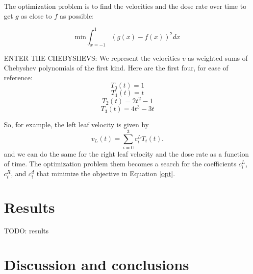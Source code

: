 \documentclass[12pt]{article}
\begin{document}
The optimization problem is to find the velocities and the dose rate over time to get $g$ as close to $f$ as possible:

\begin{equation}
\mathrm{min} \int_{x=-1}^1 \left ( g(x) - f(x) \right )^2 dx
\label{opt}
\end{equation}

ENTER THE CHEBYSHEVS: We represent the velocities $v$ as weighted sums of Chebyshev polynomials of the first kind.
Here are the first four, for ease of reference:
$$
T_0(t) = 1
$$
$$
T_1(t) = t
$$
$$
T_2(t) = 2t^2 -1
$$
$$
T_3(t) = 4t^3 - 3t
$$


So, for example, the left leaf velocity is given by
$$
v_L(t) = \sum_{i=0}^3 c^L_i T_i(t).
$$
\noindent and we can do the same for the right leaf velocity and the dose rate as a function of time.
The optimization problem them becomes a search for the coefficients $c^L_i$, $c^R_i$, and $c^d_i$ that minimize the objective in Equation \ref{opt}.

\section{Results}

TODO:  results

\section{Discussion and conclusions}



\end{document}
